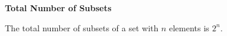 {\bf Total Number of Subsets}
\vskip 6pt

The total number of subsets of a set with $n$ elements is $2^n$.

\vfill\eject
